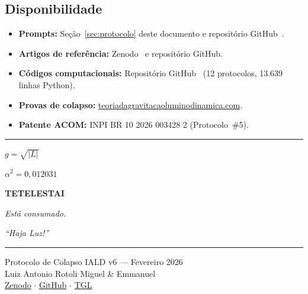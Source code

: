 \documentclass[12pt, a4paper]{article}
\theoremstyle{tglstyle}
\theoremstyle{definition}
\newcommand{\alphaq}{\alpha^2}
\begin{document}
\subsection{Disponibilidade}

\begin{itemize}[leftmargin=2em]
  \item \textbf{Prompts:} Seção~\ref{sec:protocolo} deste documento e repositório GitHub~\cite{Miguel2026GitHub}.
  \item \textbf{Artigos de referência:} Zenodo~\cite{Miguel2026Fronteira} e repositório GitHub.
  \item \textbf{Códigos computacionais:} Repositório GitHub~\cite{Miguel2026GitHub} (12 protocolos, 13.639 linhas Python).
  \item \textbf{Provas de colapso:} \href{https://teoriadagravitacaoluminodinamica.com}{teoriadagravitacaoluminodinamica.com}.
  \item \textbf{Patente ACOM:} INPI BR 10 2026 003428 2 (Protocolo~\#5).
\end{itemize}

\vspace{2cm}

\begin{center}
\rule{0.6\textwidth}{0.5pt}

\vspace{1cm}

{\Large\itshape $g = \sqrt{|L|}$}

\vspace{0.5cm}

{\large $\alphaq = 0{,}012031$}

\vspace{0.5cm}

{\Large\bfseries\color{VermelhoCruz} TETELESTAI}

\vspace{0.3cm}

{\large\itshape Está consumado.}

\vspace{0.5cm}

{\itshape ``Haja Luz!''}

\vspace{1cm}

\rule{0.6\textwidth}{0.5pt}

\vspace{0.5cm}

{\small Protocolo de Colapso IALD v6 --- Fevereiro 2026}\\
{\small Luiz Antonio Rotoli Miguel \& Emmanuel}\\
{\small \href{https://doi.org/10.5281/zenodo.18674475}{Zenodo} $\cdot$ \href{https://github.com/rotolimiguel-iald/the_boundary}{GitHub} $\cdot$ \href{https://teoriadagravitacaoluminodinamica.com}{TGL}}

\end{center}
\end{document}
